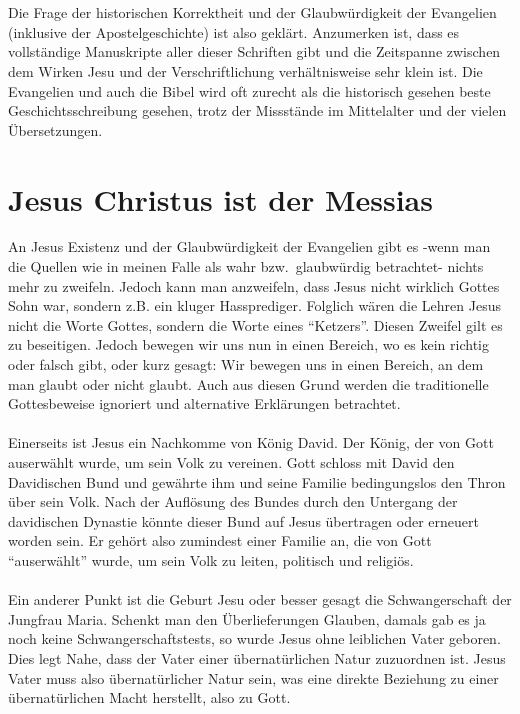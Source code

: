 \\~\\
Die Frage der historischen Korrektheit und der Glaubwürdigkeit der Evangelien (inklusive der Apostelgeschichte) ist also geklärt. Anzumerken ist, dass es vollständige Manuskripte aller dieser Schriften gibt und die Zeitspanne zwischen dem Wirken Jesu und der Verschriftlichung verhältnisweise sehr klein ist. Die Evangelien und auch die Bibel wird oft zurecht als die historisch gesehen beste Geschichtsschreibung gesehen, trotz der Missstände im Mittelalter und der vielen Übersetzungen.
\pagebreak
\section{Jesus Christus ist der Messias}
An Jesus Existenz und der Glaubwürdigkeit der Evangelien gibt es -wenn man die Quellen wie in meinen Falle als wahr bzw.\ glaubwürdig betrachtet- nichts mehr zu zweifeln. Jedoch kann man anzweifeln, dass Jesus nicht wirklich Gottes Sohn war, sondern z.B. ein kluger Hassprediger. Folglich wären die Lehren Jesus nicht die Worte Gottes, sondern die Worte eines ``Ketzers''. Diesen Zweifel gilt es zu beseitigen. Jedoch bewegen wir uns nun in einen Bereich, wo es kein richtig oder falsch gibt, oder kurz gesagt: Wir bewegen uns in einen Bereich, an dem man glaubt oder nicht glaubt. Auch aus diesen Grund werden die traditionelle Gottesbeweise ignoriert und alternative Erklärungen betrachtet.
\\~\\
Einerseits ist Jesus ein Nachkomme von König David. Der König, der von Gott auserwählt wurde, um sein Volk  zu vereinen. Gott schloss mit David den Davidischen Bund und gewährte ihm und seine Familie bedingungslos den Thron über sein Volk. Nach der Auflösung des Bundes durch den Untergang der davidischen Dynastie könnte dieser Bund auf Jesus übertragen oder erneuert worden sein. Er gehört also zumindest einer Familie an, die von Gott ``auserwählt'' wurde, um sein Volk zu leiten, politisch und religiös.
\\~\\
Ein anderer Punkt ist die Geburt Jesu oder besser gesagt die Schwangerschaft der Jungfrau Maria. Schenkt man den Überlieferungen Glauben, damals gab es ja noch keine Schwangerschaftstests, so wurde Jesus ohne leiblichen Vater geboren. Dies legt Nahe, dass der Vater  einer übernatürlichen Natur zuzuordnen ist. Jesus Vater muss also übernatürlicher Natur sein, was eine direkte Beziehung zu einer übernatürlichen Macht herstellt, also zu Gott.
